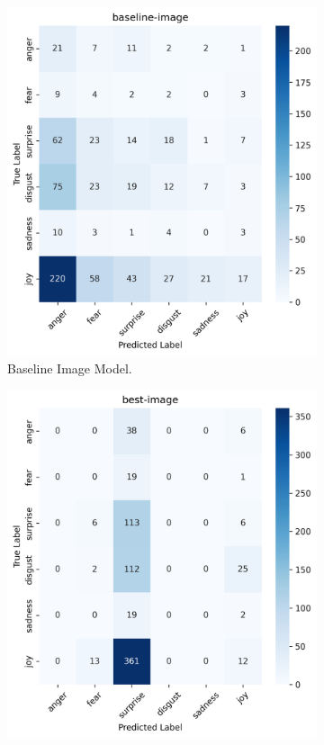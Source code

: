 \begin{figure}[ht]
    \centering
    \begin{subfigure}[b]{0.48\textwidth}
        \includegraphics[width=\textwidth]{images/confusion_matrix_baseline_image_dist.png}
        \caption{Baseline Image Model.}
        \label{fig:image-confusion-baseline}
    \end{subfigure}
    \hfill
    \begin{subfigure}[b]{0.48\textwidth}
        \includegraphics[width=\textwidth]{images/confusion_matrix_best_image_dist.png}

\end{subfigure}
\end{figure}
